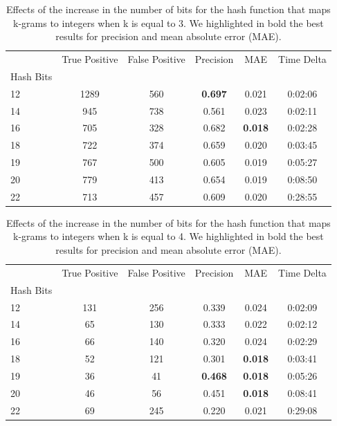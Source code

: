 \documentclass[runningheads]{llncs}
\begin{document}
\begin{table}
  \caption{Effects of the increase in the number of bits for the hash function that maps k-grams to integers when k is equal to 3. We highlighted in bold the best results for precision and mean absolute error (MAE).}
  \label{tab:experiments:buckets_k3}
  \centering
  \begin{tabular}{lccccc}
    \toprule
    {} &    True Positive &   False Positive &  Precision &    MAE & Time Delta \\
    Hash Bits &       &      &            &        &            \\
    \midrule
    12        &  1289 &  560 &      \textbf{0.697} &  0.021 &    0:02:06 \\
    14        &   945 &  738 &      0.561 &  0.023 &    0:02:11 \\
    16        &   705 &  328 &      0.682 &  \textbf{0.018} &    0:02:28 \\
    18        &   722 &  374 &      0.659 &  0.020 &    0:03:45 \\
    19        &   767 &  500 &      0.605 &  0.019 &    0:05:27 \\
    20        &   779 &  413 &      0.654 &  0.019 &    0:08:50 \\
    22        &   713 &  457 &      0.609 &  0.020 &    0:28:55 \\
    \bottomrule
  \end{tabular}
\end{table}

\begin{table}
  \caption{Effects of the increase in the number of bits for the hash function that maps k-grams to integers when k is equal to 4. We highlighted in bold the best results for precision and mean absolute error (MAE).}
  \label{tab:experiments:buckets_k4}
  \centering
  \begin{tabular}{lccccc}
    \toprule
    {} &  True Positive &  False Positive &  Precision &    MAE & Time Delta \\
    Hash Bits &                &                 &            &        &            \\
    \midrule
    12        &            131 &             256 &      0.339 &  0.024 &    0:02:09 \\
    14        &             65 &             130 &      0.333 &  0.022 &    0:02:12 \\
    16        &             66 &             140 &      0.320 &  0.024 &    0:02:29 \\
    18        &             52 &             121 &      0.301 &  \textbf{0.018} &    0:03:41 \\
    19        &             36 &              41 &      \textbf{0.468} &  \textbf{0.018} &    0:05:26 \\
    20        &             46 &              56 &      0.451 &  \textbf{0.018} &    0:08:41 \\
    22        &             69 &             245 &      0.220 &  0.021 &    0:29:08 \\
    \bottomrule
    \end{tabular}
\end{table}
\end{document}
